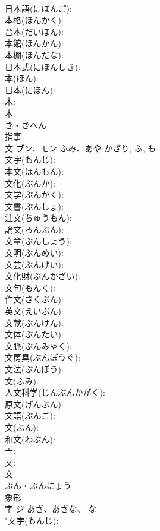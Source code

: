 \documentclass[8pt]{extreport}
\begin{document}
\begin{CJK}{UTF8}{min}
\\	日本語(にほんご): 
\\	本格(ほんかく): 
\\	台本(だいほん): 
\\	本館(ほんかん): 
\\	本棚(ほんだな): 
\\	日本式(にほんしき): 
\\	本(ほん): 
\\	日本(にほん): 
\\	木: 
\\	木	
\\	き・きへん	
\\	指事 
\\	文	ブン、モン	ふみ、あや	かざり, ふ, も	
\\	文字(もんじ): 
\\	本文(ほんもん): 
\\	文化(ぶんか): 
\\	文学(ぶんがく): 
\\	文書(ぶんしょ): 
\\	注文(ちゅうもん): 
\\	論文(ろんぶん): 
\\	文章(ぶんしょう): 
\\	文明(ぶんめい): 
\\	文芸(ぶんげい): 
\\	文化財(ぶんかざい): 
\\	文句(もんく): 
\\	作文(さくぶん): 
\\	英文(えいぶん): 
\\	文献(ぶんけん): 
\\	文体(ぶんたい): 
\\	文脈(ぶんみゃく): 
\\	文房具(ぶんぼうぐ): 
\\	文法(ぶんぽう): 
\\	文(ふみ): 
\\	人文科学(じんぶんかがく): 
\\	原文(げんぶん): 
\\	文語(ぶんご): 
\\	文(ぶん): 
\\	和文(わぶん): 
\\	亠: 
\\	乂: 
\\	文	
\\	ぶん・ぶんにょう	
\\	象形 
\\	字	ジ	あざ、あざな、-な		
\\	"文字(もんじ): 

\end{CJK}
\end{document}
